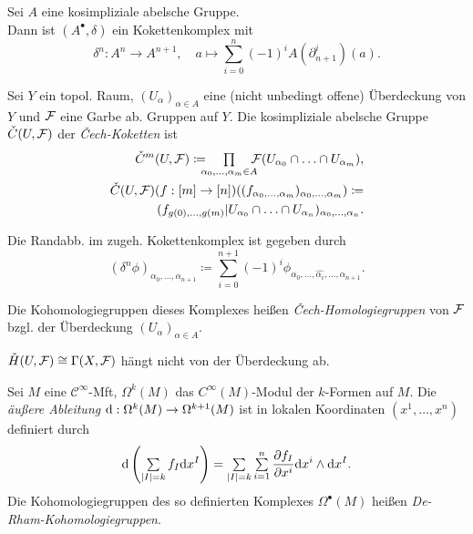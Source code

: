 \documentclass{cheat-sheet}
\newcommand{\nspace}[1]{\foreach \i in {1,...,#1}{ \! }} %
\newcommand{\Cont}{\mathcal{C}} %
\begin{document}
\begin{defn}
  Sei $A$ eine kosimpliziale abelsche Gruppe. \\
  Dann ist $(A^\bullet, \delta)$ ein Kokettenkomplex mit
  \[
    \delta^n : A^n \to A^{n+1}, \quad
    a \mapsto \sum_{i=0}^n (-1)^i A(\partial_{n+1}^i)(a).
  \]
\end{defn}


\begin{defn}
  Sei $Y$ ein topol. Raum, $(U_\alpha)_{\alpha \in A}$ eine (nicht unbedingt offene) Überdeckung von $Y$ und $\mathcal{F}$ eine Garbe ab. Gruppen auf $Y$. Die kosimpliziale abelsche Gruppe $\check{C}(U, \mathcal{F})$ der \emph{Čech-Koketten} ist
  \begin{align*}
    \check{C}^m(U, \Fais) \coloneqq \nspace{4} \prod_{\alpha_0, \ldots, \alpha_m \in A} \nspace{4} \Fais(U_{\alpha_0} \cap \ldots \cap U_{\alpha_m}), \\
    \check{C}(U, \Fais)(f : [m] \to [n])((f_{\alpha_0, \ldots ,\alpha_m})_{\alpha_0, \ldots, \alpha_m}) \coloneqq \\
    (f_{g(0), \ldots, g(m)}|U_{\alpha_0} \cap \ldots \cap U_{\alpha_n})_{\alpha_0, \nldots, \alpha_n}.
  \end{align*}
\end{defn}

\begin{bem}
  Die Randabb. im zugeh. Kokettenkomplex ist gegeben durch
  \[ (\delta^n \phi)_{\alpha_0, \ldots, \alpha_{n+1}} \coloneqq \sum_{i=0}^{n+1} (-1)^i \phi_{\alpha_0, \ldots, \hat{\alpha_i}, \ldots, \alpha_{n+1}}. \]
\end{bem}

\begin{defn}
  Die Kohomologiegruppen dieses Komplexes heißen \emph{Čech-Homologiegruppen} von $\mathcal{F}$ bzgl. der Überdeckung $(U_\alpha)_{\alpha \in A}$.
\end{defn}

\begin{bem}
  $\check{H}(U, \mathcal{F}) \cong \Gamma(X, \mathcal{F})$ hängt nicht von der Überdeckung ab.
\end{bem}


\begin{defn}
  Sei $M$ eine $\Cont^\infty$-Mft, $\Omega^k(M)$ das $C^\infty(M)$-Modul der $k$-Formen auf $M$. Die \emph{äußere Ableitung} $\mathrm{d} : \Omega^k(M) \to \Omega^{k+1}(M)$ ist in lokalen Koordinaten $(x^1, \ldots, x^n)$ definiert durch
  \[ \d \left( \sum_{\abs{I} = k} f_I \d x^I \right) = \sum_{\abs{I} = k} \sum_{i=1}^n \frac{\partial f_I}{\partial x^i} \d x^i \wedge \d x^I. \]
  Die Kohomologiegruppen des so definierten Komplexes $\Omega^\bullet(M)$ heißen \emph{De-Rham-Kohomologiegruppen}.
\end{defn}
\end{document}
